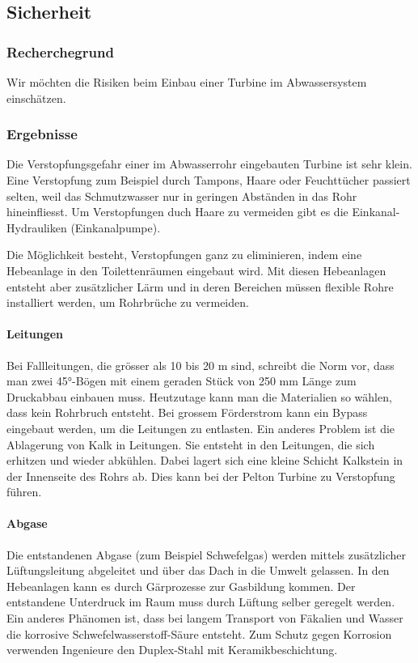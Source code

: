 \subsection{Sicherheit}


\subsubsection{Recherchegrund}
Wir möchten die Risiken beim Einbau einer Turbine im Abwassersystem einschätzen.

\subsubsection{Ergebnisse}
Die Verstopfungsgefahr einer im Abwasserrohr eingebauten Turbine ist sehr klein. 
Eine Verstopfung zum Beispiel durch Tampons, Haare oder Feuchttücher passiert selten, weil das Schmutzwasser nur in geringen Abständen in das Rohr hineinfliesst. 
Um Verstopfungen duch Haare zu vermeiden gibt es die Einkanal-Hydrauliken (Einkanalpumpe).\cite{Homa-Pumpen}

Die Möglichkeit besteht, Verstopfungen ganz zu eliminieren, indem eine Hebeanlage in den Toilettenräumen eingebaut wird. Mit diesen Hebeanlagen entsteht aber zusätzlicher Lärm und in deren Bereichen müssen flexible Rohre installiert werden, um Rohrbrüche zu vermeiden. \cite{Hebeanlagen}\cite{TippzumBau}

\paragraph{Leitungen}
Bei Fallleitungen, die grösser als 10 bis 20 \si{m} sind, schreibt die Norm vor, dass man zwei 45°-Bögen mit einem geraden Stück von 250 \si{mm} Länge zum Druckabbau einbauen muss. Heutzutage kann man die Materialien so wählen, dass kein Rohrbruch entsteht. Bei grossem Förderstrom kann ein Bypass eingebaut werden, um die Leitungen zu entlasten. 
Ein anderes Problem ist die Ablagerung von Kalk in Leitungen. Sie entsteht in den Leitungen, die sich erhitzen und wieder abkühlen. Dabei lagert sich eine kleine Schicht Kalkstein in der Innenseite des Rohrs ab. Dies kann bei der Pelton Turbine zu Verstopfung führen.\cite{BauNetzMedia,Mediagon,ksb}

\paragraph{Abgase}
Die entstandenen Abgase (zum Beispiel Schwefelgas) werden mittels zusätzlicher Lüftungsleitung abgeleitet und über das Dach in die Umwelt gelassen. In den Hebeanlagen kann es durch Gärprozesse zur Gasbildung kommen. Der entstandene Unterdruck im Raum muss durch Lüftung selber geregelt werden. 
Ein anderes Phänomen ist, dass bei langem Transport von Fäkalien und Wasser die korrosive Schwefelwasserstoff-Säure entsteht. Zum Schutz gegen Korrosion verwenden Ingenieure den Duplex-Stahl mit Keramikbeschichtung.\cite{Water_Wastewater}



